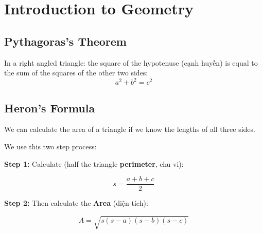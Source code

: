 \chapter{Introduction to Geometry}

\section{Pythagoras's Theorem}

In a right angled triangle: the square of the hypotenuse (cạnh huyền) is equal to the sum of the squares of the other two sides:$$a^2 + b^2 = c^2$$


\section{Heron's Formula}

We can calculate the area of a triangle if we know the lengths of all three sides.

We use this two step process:

\textbf{Step 1:} Calculate  (half the triangle \textbf{perimeter}, chu vi):

\[s=\frac{a+b+c}{2}\]

\textbf{Step 2:} Then calculate the \textbf{Area} (diện tích):

\[A=\sqrt{s(s-a)(s-b)(s-c)}\]
